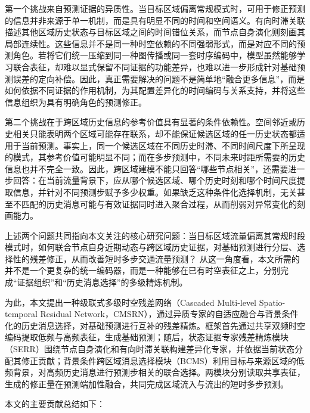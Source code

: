 第一个挑战来自预测证据的异质性。当目标区域偏离常规模式时，可用于修正预测的信息并非来源于单一机制，而是具有明显不同的时间和空间语义。有向时滞关联描述其他区域历史状态与目标区域之间的时间错位关系，而节点自身演化则刻画其局部连续性。这些信息并不是同一种时空依赖的不同强弱形式，而是对应不同的预测角色。若将它们统一压缩到同一种图传播或同一套时序编码中，模型虽然能够学习联合表征，却难以显式保留不同证据的功能差异，也难以进一步形成针对基础预测误差的定向补偿。因此，真正需要解决的问题不是简单地“融合更多信息”，而是如何依据不同证据的作用机制，为其配置差异化的时间编码与关系支持，并将这些信息组织为具有明确角色的预测修正。

第二个挑战在于跨区域历史信息的参考价值具有显著的条件依赖性。空间邻近或历史相关只能表明两个区域可能存在联系，却不能保证候选区域的任一历史状态都适用于当前预测。事实上，同一个候选区域在不同历史时滞、不同时间尺度下所呈现的模式，其参考价值可能明显不同；而在多步预测中，不同未来时距所需要的历史信息也并不完全一致。因此，跨区域建模不能只回答“哪些节点相关”，还需要进一步回答：在当前流量背景下，应从哪个候选区域、哪个历史时刻和哪个时间尺度提取信息，并针对不同预测步赋予多少权重。如果缺乏这种条件化选择机制，无关甚至不匹配的历史消息可能与有效证据同时进入聚合过程，从而削弱对异常变化的刻画能力。

上述两个问题共同指向本文关注的核心研究问题：当目标区域流量偏离其常规时段模式时，如何联合节点自身近期动态与跨区域历史证据，对基础预测进行分层、选择性的残差修正，从而改善短时多步交通流量预测？ 从这一角度看，本文所需的并不是一个更复杂的统一编码器，而是一种能够在已有时空表征之上，分别完成“证据组织”和“历史消息选择”的多级精炼机制。

为此，本文提出一种级联式多级时空残差网络（Cascaded Multi-level Spatio-temporal Residual Network，CMSRN），通过异质专家的自适应融合与背景条件化的历史消息选择，对基础预测进行互补的残差精炼。框架首先通过共享双频时空编码提取低频与高频表征，生成基础预测；随后，状态证据专家残差精炼模块（SERR）围绕节点自身演化和有向时滞关联构建差异化专家，并依据当前状态分配其修正贡献；背景条件跨区域消息选择模块（BCMS）利用目标与来源区域的低频背景，对高频历史消息进行预测步相关的联合选择。两模块分别读取共享表征，生成的修正量在预测端加性融合，共同完成区域流入与流出的短时多步预测。

本文的主要贡献总结如下：

